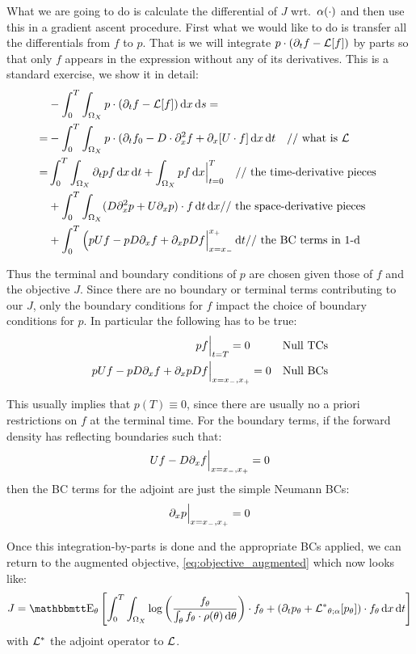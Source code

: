 What we are going to do is calculate the differential of $J$ wrt.\ $\alpha(\cdot)$
and then use this in a gradient ascent procedure. First what we would like to do
is transfer all the differentials from $f$ to $p$. That is we will integrate $p
\cdot ({\partial}_t f - { \mathcal{L} }[f])$ by parts so that only $f$ appears in the expression
without any of its derivatives. This is a standard exercise, we show it in
detail:
\begin{align*}
&-\int_0^T \int_{{\Omega}_X} p \cdot ({\partial}_t f - { \mathcal{L} }[f]) \, \mathrm{d} x \, \mathrm{d} s=
\\
=&-\int_0^T \int_{{\Omega}_X} p \cdot 
({\partial}_t f_0 - D \cdot {\partial}_x^2 f + {\partial}_x [U \cdot f]
\, \mathrm{d} x \, \mathrm{d} t \quad \textrm{// what is }{ \mathcal{L} }
\\
=&
 \int_0^T\int_{{\Omega}_X} {\partial}_t p  f \, \mathrm{d} x \, \mathrm{d} t +
  \int_{{\Omega}_X} p f\, \mathrm{d} x  \Big|^{T}_{t=0} \quad \textrm{// the time-derivative pieces }
  \\
  &+ \int_0^T \int_{{\Omega}_X}
	    (D {\partial}^2_x p + U {\partial}_x p)\cdot f 
	  \, \mathrm{d} t\, \mathrm{d} x  \textrm{// the space-derivative pieces }
	  \\
	  &+ \int_0^T 
	   \Big( p U f - p D {\partial}_xf + {\partial}_x p D f \Big|_{x={ x_{-} }}^{{ x_{+} }} 
	  \, \mathrm{d} t
	   \textrm{// the BC terms in 1-d}
\end{align*}

Thus the terminal and boundary conditions of $p$ are chosen given those of $f$
and the objective $J$. Since there are no boundary or terminal terms
contributing to our $J$, only the boundary conditions for $f$ impact the
choice of boundary conditions for $p$. In particular the following has to be
true:
\begin{align*}
pf&\Big|_{t=T}  = 0 & \textrm{Null TCs} \\
p U f - p D {\partial}_xf + {\partial}_x p D f &\Big|_{x={ x_{-} }, { x_{+} }} = 0 & \textrm{Null BCs}
\end{align*}

This usually implies that $p(T) \equiv 0$, since there are usually no a priori
restrictions on $f$ at the terminal time. For the boundary terms, 
if the forward density has reflecting boundaries such that:
$$
U f - D{\partial}_x f\Big|_{x={ x_{-} }, { x_{+} }}  = 0
$$
then the BC terms for the adjoint are just the simple Neumann BCs:
$$
{\partial}_x p \Big|_{x={ x_{-} }, { x_{+} }} = 0
$$

Once this integration-by-parts is done and the appropriate BCs applied, we
can return to the augmented objective, \cref{eq:objective_augmented} which now
looks like:
\begin{equation}
J =  \Exp_\th
\left[ \int_0^T\int_{\O_X} \log\left(\frac{f_\th}
 					{\int_\th f_\th \cdot \rho(\th)\intd{\th}}\right) 
 			 \cdot f_\th 
 			 + 
 			 (\di_t p_\th + \Lstar_{\th;\a}[p_\th] ) \cdot f_\th
\intd{x}
\intd{t} \right]
\label{eq:objective_augmented_adjoined}
\end{equation}
with ${ { \mathcal{L} }^* }$ the adjoint operator to ${ \mathcal{L} }$.

